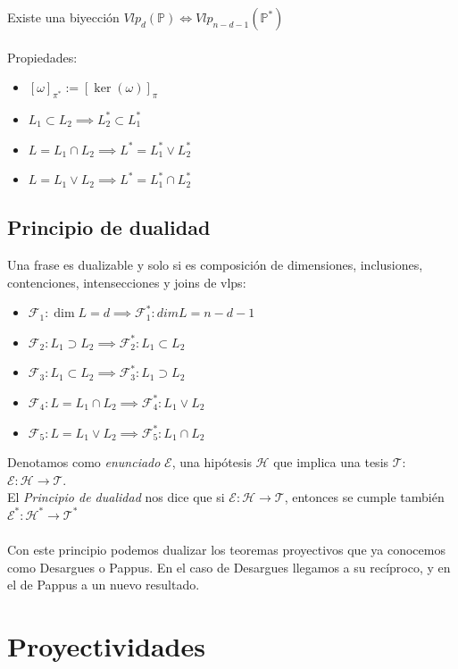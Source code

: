 \documentclass{myclass}
\renewcommand{\P}{\mathbb{P}}
\begin{document}
Existe una biyección $Vlp_d(\P) \iff Vlp_{n-d-1}(\P^*)$ \\
\\

Propiedades:
\begin{itemize}
  \item $[\omega]_{\pi^*} := [\ker(\omega)]_\pi$
  \item $L_1\subset L_2 \implies L_2^*\subset L_1^*$
  \item $L = L_1\cap L_2 \implies L^* = L_1^* \vee L_2^*$
  \item $L = L_1\vee L_2 \implies L^* = L_1^* \cap L_2^*$

\end{itemize}

\subsection{Principio de dualidad}
Una frase es dualizable y solo si es composición de dimensiones, inclusiones, contenciones, intensecciones y joins de vlps:
\begin{itemize}
  \item $\mathcal{F}_1: \dim L = d \implies \mathcal{F}_1^*: dim L = n-d-1$
  \item $\mathcal{F}_2: L_1 \supset L_2 \implies \mathcal{F}_2^*: L_1 \subset L_2$
  \item $\mathcal{F}_3: L_1 \subset L_2 \implies \mathcal{F}_3^*: L_1 \supset L_2$
  \item $\mathcal{F}_4: L = L_1 \cap L_2 \implies \mathcal{F}_4^*: L_1 \vee L_2$
  \item $\mathcal{F}_5: L = L_1 \vee L_2 \implies \mathcal{F}_5^*: L_1 \cap L_2$
\end{itemize}
Denotamos como \textit{enunciado} $\mathcal{E}$, una hipótesis $\mathcal{H}$ que implica una tesis $\mathcal{T}$: $\mathcal{E}: \mathcal{H}\to \mathcal{T}$.\\
El \textit{Principio de dualidad} nos dice que si  $\mathcal{E}: \mathcal{H}\to \mathcal{T}$, entonces se cumple también $\mathcal{E}^*: \mathcal{H}^*\to \mathcal{T}^*$ \\
\\
Con este principio podemos dualizar los teoremas proyectivos que ya conocemos como Desargues o Pappus. En el caso de Desargues llegamos a su recíproco, y en el de Pappus a un nuevo resultado.




\section{Proyectividades}
\end{document}
